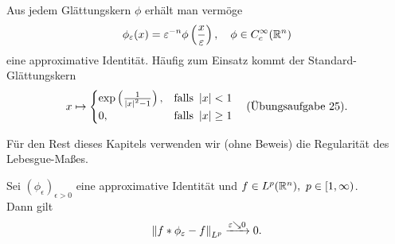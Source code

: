 \documentclass[skript.tex]{subfiles}
\begin{document}
	\begin{bem}
		Aus jedem Glättungskern $\phi$ erhält man vermöge
		\[
			\phi_\varepsilon(x) = \varepsilon^{-n}\phi\left(\frac{x}{\varepsilon}\right),\quad\phi\in C_c^\infty(\mathbb{R}^n)
		\]
		eine approximative Identität. Häufig zum Einsatz kommt der Standard-Glättungskern
		\[
			x \mapsto
			\begin{cases}
				\exp\left(\frac{1}{\left| x \right|^2-1}\right), &\text{falls } \left| x \right| < 1 \\
				0, &\text{falls } \left| x \right| \geq 1
			\end{cases}
			\quad\text{(Übungsaufgabe 25)}.
		\]
	\end{bem}
	
	Für den Rest dieses Kapitels verwenden wir (ohne Beweis) die Regularität des Lebesgue-Maßes.
	
	\begin{lem}
		Sei $(\phi_\epsilon)_{\epsilon>0}$ eine approximative Identität und $f \in L^p(\mathbb{R}^n),\ p\in[1,\infty)$.\\
		Dann gilt
		\[
			\left\lVert f \ast \phi_\varepsilon-f \right\rVert_{L^p} \xrightarrow{\varepsilon\searrow 0} 0.
		\]
	\end{lem}
\end{document}
